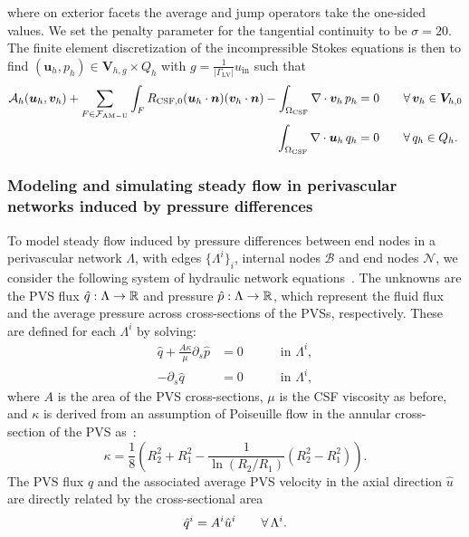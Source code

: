 \documentclass[fleqn,10pt]{wlscirep}
\begin{document}
where on exterior facets the average and jump operators take the one-sided values. We set the penalty parameter for the tangential continuity to be $\sigma = 20$. The finite element discretization of the incompressible Stokes equations is then to find $(\bm u_h, p_h) \in \bm V_{h,g} \times Q_h$ with $g  = \frac{1}{|\Gamma_{\mathrm{LV}}|} u_{\mathrm{in}}$  such that 
\begin{subequations}
\begin{align}
  \mathcal{A}_h(\bm u_h, \bm v_h)
  + \sum_{F \in \mathcal{F}_{\rm AM-U}} \int_{F} R_{\rm CSF, 0} (\bm u_h \cdot \bm n) (\bm v_h \cdot \bm n)
  - \int_{\Omega_{\rm CSF}} \nabla \cdot \bm v_h \, p_h  &= 0 \qquad \forall \, \bm v_h \in \bm V_{h,0} \\ 
\int_{\Omega_{\rm CSF}} \nabla \cdot \bm u_h \, q_h  &= 0 \qquad \forall \, q_h \in Q_h.
\end{align}
\end{subequations}


\subsubsection{Modeling and simulating steady flow in perivascular networks induced by pressure differences}
\label{sec:app:hydraulic_network}

To model steady flow induced by pressure differences between end nodes
in a perivascular network $\Lambda$, with edges $\{\Lambda^i\}_i$,
internal nodes $\mathcal{B}$ and end nodes $\mathcal{N}$, we consider
the following system of hydraulic network
equations~\cite{tithof2022network, daversin2022geometrically,
  gjerde2024directional}. The unknowns are the PVS flux $\hat{q} :
\Lambda \rightarrow \mathbb{R}$ and pressure $\hat{p} : \Lambda
\rightarrow \mathbb{R}$, which represent the fluid flux and the average
pressure across cross-sections of the PVSs, respectively. These are
defined for each $\Lambda^i$ by solving:
\begin{subequations}
\begin{alignat}{2}
  \hat{q} + \frac{A \kappa}{\mu} \partial_{s} \hat{p} & = 0 &&
  \quad \text{ in } \Lambda^i , \\ 
  - \partial_s \hat{q} & = 0 &&
  \quad \text{ in } \Lambda^i ,  
\end{alignat} 
\label{eq:1d_flow}%
\end{subequations}%
where $A$ is the area of the PVS cross-sections, $\mu$ is the CSF viscosity as before, and $\kappa$ is derived from an assumption of Poiseuille flow in the annular cross-section of the PVS as~\cite{tithof2022network}: 
\begin{equation}
\kappa = \frac18 \left( R_2^2 + R_1^2 - \frac{1}{\ln(R_2/R_1)} (R_2^2- R_1^2) \right). 
\end{equation}
The PVS flux $\hat{q}$ and the associated average PVS velocity in the
axial direction $\hat{u}$ are directly related by the cross-sectional area
\begin{equation}
  \hat{q}^i = A^i \hat{u}^i \qquad \forall \, \Lambda^i.
\end{equation}
\end{document}

